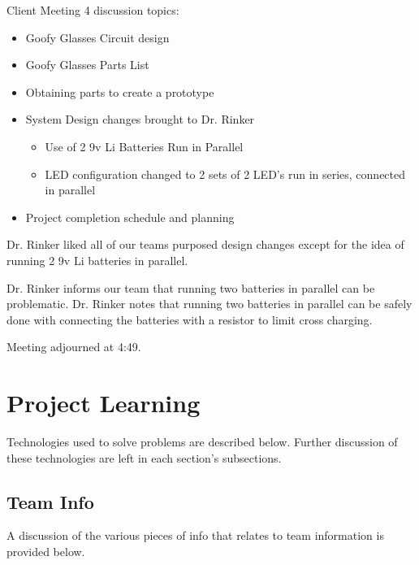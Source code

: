 \documentclass[12pt]{article}
\begin{document}
	\noindent
	Client Meeting 4 discussion topics:
	
	\begin{itemize}
	\item Goofy Glasses Circuit design
	\item Goofy Glasses Parts List
	\item Obtaining parts to create a prototype
	\item System Design changes brought to Dr. Rinker
	
		\begin{itemize}
		\item Use of 2 9v Li Batteries Run in Parallel
		\item LED configuration changed to 2 sets of 2 LED's run in series, connected 		in parallel
		\end{itemize}
	\item Project completion schedule and planning
	\end{itemize}
	
	\noindent
	Dr. Rinker liked all of our teams purposed design changes except for the idea of 		running 2 9v Li batteries in parallel.
	
	\noindent
	Dr. Rinker informs our team that running two batteries in parallel can be 				problematic. Dr. Rinker notes that running two batteries in parallel can be 			safely done with connecting the batteries with a resistor to limit cross 				charging.
	
	Meeting adjourned at 4:49.
	\clearpage
	
\section{Project Learning}
	Technologies used to solve problems are described below. Further discussion of these technologies are left in each section's subsections.

	\subsection{Team Info}
	 A discussion of the various pieces of info that relates to team information is provided below.
	
\end{document}
